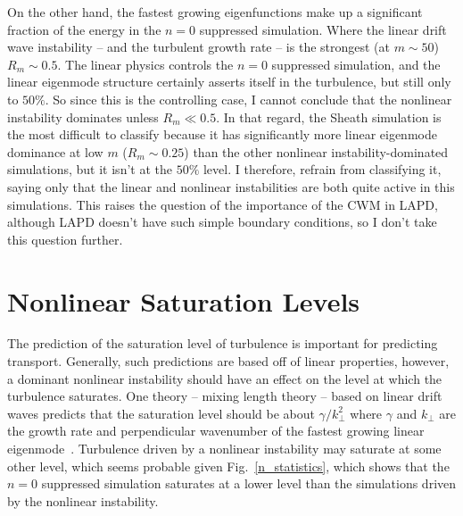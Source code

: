 On the other hand, the fastest growing eigenfunctions make up a significant fraction of the energy in the $n=0$ suppressed simulation. Where the linear drift wave instability 
-- and the turbulent growth rate -- is the strongest (at $m \sim 50$) $R_m \sim 0.5$. 
The linear physics controls the $n=0$ suppressed simulation, and the linear eigenmode structure certainly asserts itself in the turbulence, but still only to $50\%$. So since this is the controlling
case, I cannot conclude that the nonlinear instability dominates unless $R_m \ll 0.5$.
In that regard, the Sheath simulation is the most difficult to classify because it has significantly more linear eigenmode dominance at low $m$ ($R_m \sim 0.25$) than the other nonlinear 
instability-dominated simulations, but it isn't at the $50\%$ level. I therefore, refrain from classifying it, saying only that the linear and nonlinear instabilities are both quite active
in this simulations. This raises the question of the importance of the CWM in LAPD, although LAPD doesn't have such simple boundary conditions, so I don't take this question further. 


\section{Nonlinear Saturation Levels}
\label{ss_nl_sat_levels}

The prediction of the saturation level of turbulence is important for predicting transport. Generally, such predictions are based off of linear properties, however, a dominant nonlinear
instability should have an effect on the level at which the turbulence saturates. One theory -- mixing length theory -- based on linear drift waves predicts that the saturation level should
be about $\gamma/k_\perp^2$ where $\gamma$ and $k_\perp$ are the growth rate and perpendicular wavenumber of the fastest growing linear eigenmode~\cite{horton1990}. Turbulence driven
by a nonlinear instability may saturate at some other level, which seems probable given Fig.~\ref{n_statistics}, which shows that the $n=0$ suppressed simulation saturates
at a lower level than the simulations driven by the nonlinear instability.

